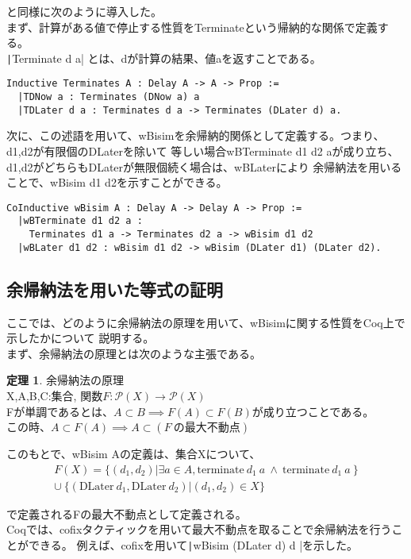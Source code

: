 \documentclass[japanese]{jssst_ppl}
\theoremstyle{definition}
\newtheorem{theorem}{定理}
\begin{document}
\cite{ddd}と同様に次のように導入した。\\


まず、計算がある値で停止する性質をTerminateという帰納的な関係で定義する。\\
\texttt|Terminate d a| とは、dが計算の結果、値aを返すことである。
\begin{verbatim}
Inductive Terminates A : Delay A -> A -> Prop :=
  |TDNow a : Terminates (DNow a) a
  |TDLater d a : Terminates d a -> Terminates (DLater d) a.
\end{verbatim}
次に、この述語を用いて、wBisimを余帰納的関係として定義する。つまり、d1,d2が有限個のDLaterを除いて
等しい場合wBTerminate d1 d2 aが成り立ち、d1,d2がどちらもDLaterが無限個続く場合は、wBLaterにより
余帰納法を用いることで、wBisim d1 d2を示すことができる。
\begin{verbatim}
CoInductive wBisim A : Delay A -> Delay A -> Prop :=
  |wBTerminate d1 d2 a :
    Terminates d1 a -> Terminates d2 a -> wBisim d1 d2
  |wBLater d1 d2 : wBisim d1 d2 -> wBisim (DLater d1) (DLater d2).
\end{verbatim}

\subsection{余帰納法を用いた等式の証明}
ここでは、どのように余帰納法の原理を用いて、wBisimに関する性質をCoq上で示したかについて
説明する。\\
まず、余帰納法の原理とは次のような主張である。
\begin{theorem}{余帰納法の原理\\}
  X,A,B,C:集合,
  関数$F:\mathcal{P}(X) \to \mathcal{P}(X)$\\
  Fが単調であるとは、$A \subset B \implies F(A) \subset F(B)$が成り立つことである。\\
  この時、$A \subset F(A) \implies A \subset (F \ \text{の最大不動点})$
\end{theorem}
このもとで、wBisim Aの定義は、集合Xについて、
\begin{align*}
  F(X) = \{ (d_1, d_2) | \exists a \in A, \text{terminate} \ d_1 \ a \ \land \ \text{terminate} \ d_1 \ a \ \} \\
  \cup \ \{ (\text{DLater} \ d_1, \text{DLater} \  d_2) | (d_1, d_2) \in X\}
\end{align*}


で定義されるFの最大不動点として定義される。\\
Coqでは、cofixタクティックを用いて最大不動点を取ることで余帰納法を行うことができる。
例えば、cofixを用いて\texttt|wBisim (DLater d) d |を示した。
\end{document}
